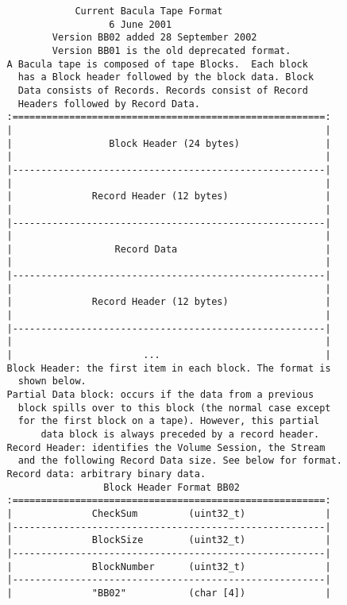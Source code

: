 \footnotesize
\begin{verbatim}
               Current Bacula Tape Format
                     6 June 2001
           Version BB02 added 28 September 2002
           Version BB01 is the old deprecated format.
   A Bacula tape is composed of tape Blocks.  Each block
     has a Block header followed by the block data. Block
     Data consists of Records. Records consist of Record
     Headers followed by Record Data.
   :=======================================================:
   |                                                       |
   |                 Block Header (24 bytes)               |
   |                                                       |
   |-------------------------------------------------------|
   |                                                       |
   |              Record Header (12 bytes)                 |
   |                                                       |
   |-------------------------------------------------------|
   |                                                       |
   |                  Record Data                          |
   |                                                       |
   |-------------------------------------------------------|
   |                                                       |
   |              Record Header (12 bytes)                 |
   |                                                       |
   |-------------------------------------------------------|
   |                                                       |
   |                       ...                             |
   Block Header: the first item in each block. The format is
     shown below.
   Partial Data block: occurs if the data from a previous
     block spills over to this block (the normal case except
     for the first block on a tape). However, this partial
         data block is always preceded by a record header.
   Record Header: identifies the Volume Session, the Stream
     and the following Record Data size. See below for format.
   Record data: arbitrary binary data.
                    Block Header Format BB02
   :=======================================================:
   |              CheckSum         (uint32_t)              |
   |-------------------------------------------------------|
   |              BlockSize        (uint32_t)              |
   |-------------------------------------------------------|
   |              BlockNumber      (uint32_t)              |
   |-------------------------------------------------------|
   |              "BB02"           (char [4])              |

\end{verbatim}
